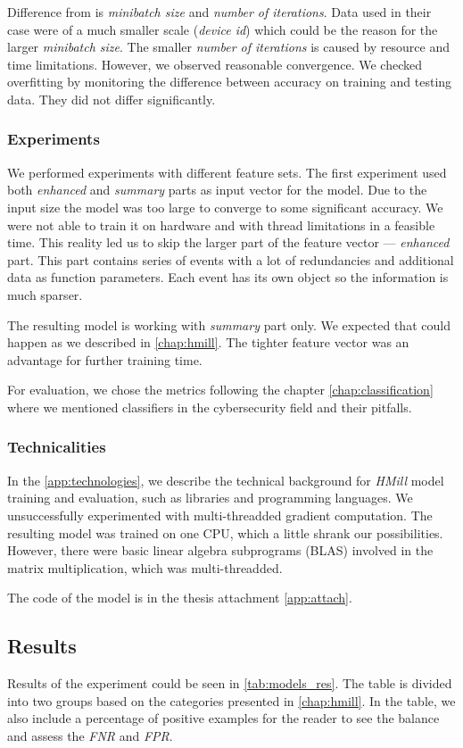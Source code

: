 Difference from \cite{Mandlik2020} is \emph{minibatch size} and \emph{number of iterations}. Data used in their case were of a much smaller scale (\emph{device id}) which could be the reason for the larger \emph{minibatch size}. The smaller \emph{number of iterations} is caused by resource and time limitations. However, we observed reasonable convergence. We checked overfitting by monitoring the difference between accuracy on training and testing data. They did not differ significantly.

\subsubsection{Experiments}
We performed experiments with different feature sets. The first experiment used both \emph{enhanced} and \emph{summary} parts as input vector for the model. Due to the input size the model was too large to converge to some significant accuracy. We were not able to train it on hardware and with thread limitations in a feasible time. This reality led us to skip the larger part of the feature vector --- \emph{enhanced} part. This part contains series of events with a lot of redundancies and additional data as function parameters. Each event has its own object so the information is much sparser.

The resulting model is working with \emph{summary} part only.  We expected that could happen as we described in \ref{chap:hmill}. The tighter feature vector was an advantage for further training time.

For evaluation, we chose the metrics following the chapter \ref{chap:classification} where we mentioned classifiers in the cybersecurity field and their pitfalls.

\subsubsection{Technicalities}
In the \ref{app:technologies}, we describe the technical background for \emph{HMill} model training and evaluation, such as libraries and programming languages. We unsuccessfully experimented with multi-threadded gradient computation. The resulting model was trained on one CPU, which a little shrank our possibilities. However, there were basic linear algebra subprograms (BLAS) involved in the matrix multiplication, which was multi-threadded.

The code of the model is in the thesis attachment \ref{app:attach}.

\subsection{Results}
Results of the experiment could be seen in \ref{tab:models_res}. The table is divided into two groups based on the categories presented in \ref{chap:hmill}. In the table, we also include a percentage of positive examples for the reader to see the balance and assess the \emph{FNR} and \emph{FPR}.

